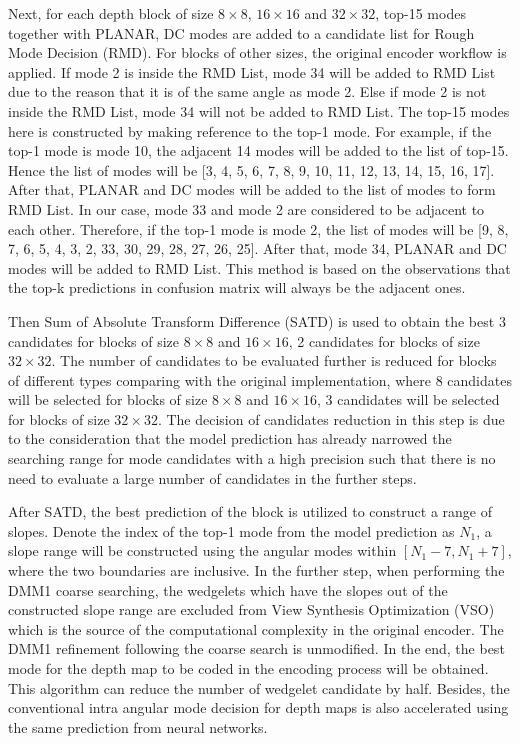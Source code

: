 Next, for each depth block of 
size \(8\times8\), \(16\times16\) and \(32\times32\), 
top-15 modes together with PLANAR, DC modes are added to 
a candidate list for Rough Mode Decision (RMD).
For blocks of other sizes, the original encoder workflow
is applied.
If mode 2 is inside the RMD List, mode 34
will be added to RMD List due to the reason that
it is of the same angle as mode 2.
Else if mode 2 is not inside the RMD List, 
mode 34 will not be added to RMD List.
The top-15 modes here is constructed by making reference to
the top-1 mode.
For example, if the top-1 mode is mode 10, 
the adjacent 14 modes will be added to the list of top-15.
Hence the list of modes will be 
[3, 4, 5, 6, 7, 8, 9, 10, 11, 12, 13, 14, 15, 16, 17].
After that, PLANAR and DC modes will be added to the list
of modes to form RMD List.
In our case, mode 33 and 
mode 2 are considered to be adjacent to each other.
Therefore, if the top-1 mode is mode 2, 
the list of modes will be
[9, 8, 7, 6, 5, 4, 3, 2, 33, 30, 29, 28, 27, 26, 25].
After that, mode 34, PLANAR and DC modes 
will be added to RMD List.
This method is based on the observations that 
the top-k predictions in confusion matrix
will always be the adjacent ones.

Then Sum of Absolute Transform Difference (SATD)
is used to obtain the best 3 candidates for blocks
of size \(8\times8\) and \(16\times16\), 2 candidates
for blocks of size \(32\times32\).
The number of candidates to be evaluated further 
is reduced for blocks of different types
comparing with the original implementation,
where 8 candidates will be selected for 
blocks of size \(8\times8\) and \(16\times16\), 
3 candidates will be selected
for blocks of size \(32\times32\).
The decision of candidates reduction in this step 
is due to the consideration that 
the model prediction has already narrowed
the searching range for mode candidates 
with a high precision such that
there is no need to evaluate
a large number of candidates in the
further steps.

After SATD, the best prediction of the block
is utilized to construct a range of slopes.
Denote the index of the top-1 mode from the model 
prediction as \(N_1\), a slope range will be constructed 
using the angular modes within \([N_1-7, N_1+7]\), where
the two boundaries are inclusive.
In the further step, when performing the DMM1 coarse
searching, the wedgelets which have the slopes out of the 
constructed slope range are excluded from 
View Synthesis Optimization (VSO) which is the
source of the computational complexity in the original
encoder.
The DMM1 refinement following the coarse search is unmodified.
In the end, the best mode for the
depth map to be coded in the encoding process will
be obtained.
This algorithm can reduce the number of wedgelet candidate by 
half.
Besides, the conventional intra 
angular mode decision for depth maps is also
accelerated using the same prediction from 
neural networks.

